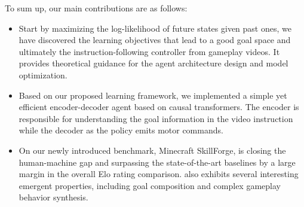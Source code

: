 \documentclass[11pt, a4paper, logo, one column]{craftjarvis}
\begin{document}
To sum up, our main contributions are as follows: 
\begin{itemize}[leftmargin=*,noitemsep,topsep=0pt]
    \item Start by maximizing the log-likelihood of future states given past ones, we have discovered the learning objectives that lead to a good goal space and ultimately the instruction-following controller from gameplay videos. It provides theoretical guidance for the agent architecture design and model optimization. 
    \item Based on our proposed learning framework, we implemented a simple yet efficient encoder-decoder agent based on causal transformers. The encoder is responsible for understanding the goal information in the video instruction while the decoder as the policy emits motor commands.
    \item On our newly introduced benchmark, Minecraft SkillForge, \agent is closing the human-machine gap and surpassing the state-of-the-art baselines by a large margin in the overall Elo rating comparison. \agent also exhibits several interesting emergent properties, including goal composition and complex gameplay behavior synthesis.
\end{itemize}





\end{document}
